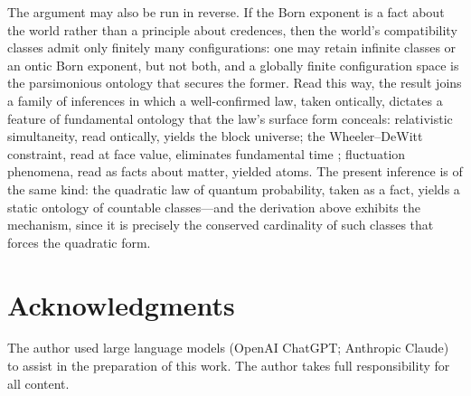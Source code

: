 \documentclass[11pt]{article}
\theoremstyle{definition}
\theoremstyle{remark}
\begin{document}
The argument may also be run in reverse. If the Born exponent is a fact about the world rather than a principle about credences, then the world's compatibility classes admit only finitely many configurations: one may retain infinite classes or an ontic Born exponent, but not both, and a globally finite configuration space is the parsimonious ontology that secures the former. Read this way, the result joins a family of inferences in which a well-confirmed law, taken ontically, dictates a feature of fundamental ontology that the law's surface form conceals: relativistic simultaneity, read ontically, yields the block universe; the Wheeler--DeWitt constraint, read at face value, eliminates fundamental time \cite{DeWitt1967}; fluctuation phenomena, read as facts about matter, yielded atoms. The present inference is of the same kind: the quadratic law of quantum probability, taken as a fact, yields a static ontology of countable classes---and the derivation above exhibits the mechanism, since it is precisely the conserved cardinality of such classes that forces the quadratic form.

\section*{Acknowledgments}
The author used large language models (OpenAI ChatGPT; Anthropic Claude) to assist in the preparation of this work. The author takes full responsibility for all content.
\end{document}
